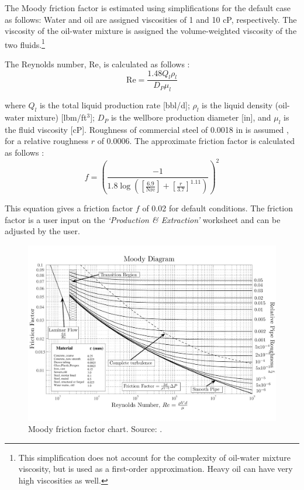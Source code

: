 \documentclass[11pt]{report}
\newcommand{\sheet}[1]{\textit{`{#1}'}}
\begin{document}
The Moody friction factor is estimated using simplifications for the default case as follows: Water and oil are assigned viscosities of 1 and 10 cP, respectively. The viscosity of the oil-water mixture is assigned the volume-weighted viscosity of the two fluids.\footnote{This simplification does not account for the complexity of oil-water mixture viscosity, but is used as a first-order approximation. Heavy oil can have very high viscosities as well.} 

The Reynolds number, Re, is calculated as follows \cite[p. 46]{Guo2007}:
\begin{equation}\label{eq:Nre}
\textrm{Re} = \frac{1.48 Q_l \rho_l}{D_P \mu_l}
\end{equation} 

where $Q_l$ is the total liquid production rate [bbl/d]; $\rho_l$ is the liquid density (oil-water mixture) [lbm/ft$^3$]; $D_P$ is the wellbore production diameter [in], and $\mu_l$ is the fluid viscosity [cP]. Roughness of commercial steel of 0.0018 in is assumed \cite{Cengel2005}, for a relative roughness $r$ of 0.0006. The approximate friction factor is calculated as follows \cite[p. 625]{Cengel2005}:
\begin{equation}\label{eq:fric_factor}
f = \left( \frac{-1}{1.8\log\left(\left[ \frac{6.9}{\textrm{Nre}}\right] + \left[ \frac{r}{3.7} \right]^{1.11} \right) } \right)^{2}
\end{equation} 

This equation gives a friction factor $f$ of 0.02 for default conditions. The friction factor is a user input on the \sheet{Production \& Extraction} worksheet and can be adjusted by the user. 

\begin{figure}
\includegraphics[width=0.85\columnwidth]{images/Moody_chart.pdf}
\caption{Moody friction factor chart. Source: \cite{Moody2008}.}
\label{fig:Moody_chart}
\end{figure}
\end{document}

